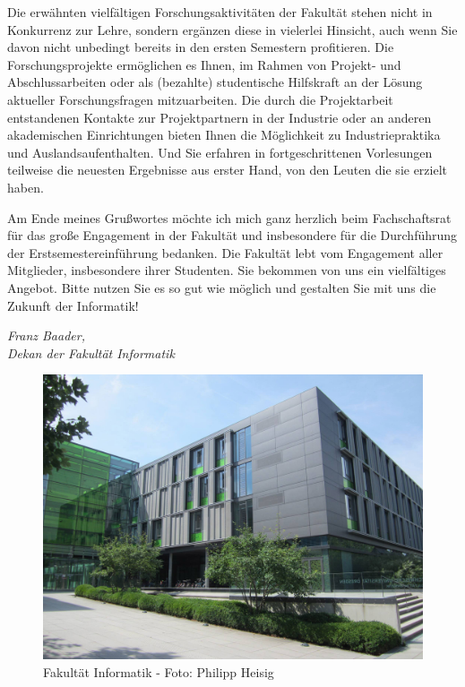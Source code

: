 Die erwähnten vielfältigen Forschungsaktivitäten der Fakultät stehen nicht in Konkurrenz zur Lehre, sondern ergänzen diese in vielerlei Hinsicht, auch wenn Sie davon nicht unbedingt bereits in den ersten Semestern profitieren. Die Forschungsprojekte ermöglichen es Ihnen, im Rahmen von Projekt- und Abschlussarbeiten oder als (bezahlte) studentische Hilfskraft an der Lösung aktueller Forschungsfragen mitzuarbeiten. Die durch die Projektarbeit entstandenen Kontakte zur Projektpartnern in der Industrie oder an anderen akademischen Einrichtungen bieten Ihnen die Möglichkeit zu Industriepraktika und Auslandsaufenthalten. Und Sie erfahren in fortgeschrittenen Vorlesungen teilweise die neuesten Ergebnisse aus erster Hand, von den Leuten die sie erzielt haben.

Am Ende meines Grußwortes möchte ich mich ganz herzlich beim Fachschaftsrat für das große Engagement in der Fakultät und insbesondere für die Durchführung der Erstsemestereinführung bedanken. Die Fakultät lebt vom Engagement aller Mitglieder, insbesondere ihrer Studenten. Sie bekommen von uns ein vielfältiges Angebot. Bitte nutzen Sie es so gut wie möglich und gestalten Sie mit uns die Zukunft der Informatik!

\textit{Franz Baader,\\
Dekan der Fakultät Informatik}

\vfill

\begin{figure}[h!]
\centering
\includegraphics[width=.9\linewidth]{img/fakultaet.jpg}
\caption*{{\small Fakultät Informatik - Foto: Philipp Heisig}}
\end{figure}
